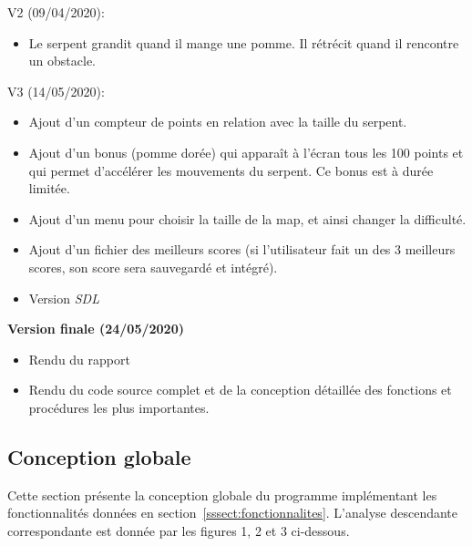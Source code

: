         \vspace{0.3 cm}
        V2 (09/04/2020):
        \begin{itemize}
        
            \item Le serpent grandit quand il mange une pomme. Il rétrécit quand il rencontre un obstacle.
            
        \end{itemize}
        
        \vspace{0.3 cm}
        V3 (14/05/2020):
        \begin{itemize}
        
             \item Ajout d'un compteur de points en relation avec la taille du serpent. 
             \item Ajout d'un bonus (pomme dorée) qui apparaît à l'écran tous les 100 points et qui permet d'accélérer les mouvements du serpent. Ce bonus est à durée limitée.
             \item Ajout d'un menu pour choisir la taille de la map, et ainsi changer la difficulté.
             \item Ajout d'un fichier des meilleurs scores (si l'utilisateur fait un des 3 meilleurs scores, son score sera sauvegardé et intégré). 
            \item Version \textit{SDL}
            
        \end{itemize}
        
        \vspace{0,5 cm}
        
        \textbf{Version finale (24/05/2020)}
        \begin{itemize}
        
             \item Rendu du rapport
             \item Rendu du code source complet et de la conception détaillée des fonctions et procédures les plus importantes. 
             
        \end{itemize}

    \subsection{Conception globale}
        Cette section présente la conception globale du programme implémentant les fonctionnalités données en section~\ref{sssect:fonctionnalites}.
        L'analyse descendante correspondante est donnée par les figures 1, 2 et 3 ci-dessous.
        
